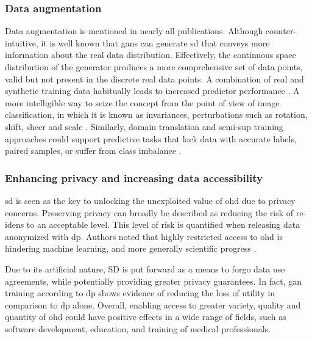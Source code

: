     \subsubsection{Data augmentation}\label{sec:augmentation}
    
    Data augmentation is mentioned in nearly all publications. Although counter-intuitive, it is well known that \glspl{gan} can generate \gls{sd} that conveys more information about the real data distribution. Effectively, the continuous space distribution of the generator produces a more comprehensive set of data points, valid but not present in the discrete real data points. A combination of real and synthetic training data habitually leads to increased predictor performance \cite{Wang_2019,Che_2017,Yoon2018-ite, yoon2018imputation}. A more intelligible way to seize the concept from the point of view of image classification, in which it is known as invariances, perturbations such as rotation, shift, sheer and scale \cite{antoniou2017data}. Similarly, domain translation and \gls{semi-sup} training approaches could support predictive tasks that lack data with accurate labels, paired samples, or suffer from class imbalance \cite{Che_2017,mcdermott2018semi}. 

    \subsubsection{Enhancing privacy and increasing data accessibility}\label{sec:access_privacy}
    
    \gls{sd} is seen as the key to unlocking the unexploited value of \gls{ohd} due to privacy concerns. Preserving privacy can broadly be described as reducing the risk of \glspl{re-iden} to an acceptable level. This level of risk is quantified when releasing data anonymized with \gls{dp}. Authors noted that highly restricted access to \gls{ohd} is hindering machine learning, and more generally scientific progress \cite{Beaulieu-Jones2019-ct, Baowaly_2019,Che_2017,esteban2017real,Fisher2019}.\par
    
    Due to its artificial nature, SD is put forward as a means to forgo data use agreements, while potentially providing greater privacy guarantees\cite{Beaulieu-Jones2019-ct, baowaly_2019_IEEE, baowaly_2019_jamia,esteban2017real,Fisher2019,walsh2020generating}. In fact, \gls{gan} training according to \gls{dp} shows evidence of reducing the loss of utility in comparison to \gls{dp} alone.  Overall, enabling access to greater variety, quality and quantity of \gls{ohd} could have positive effects in a wide range of fields, such as software development, education, and training of medical professionals. 
    
